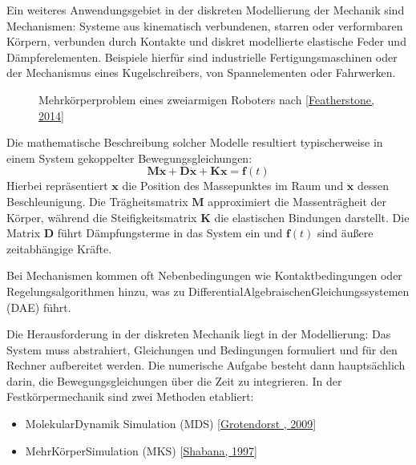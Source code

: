 \documentclass[letterpaper,10pt,german]{jupyterBook}
\let\sphinxpxdimen\pdfpxdimen\else\newdimen\sphinxpxdimen
\begin{document}
\sphinxAtStartPar
Ein weiteres Anwendungsgebiet in der diskreten Modellierung der Mechanik sind Mechanismen: Systeme aus kinematisch verbundenen, starren oder verformbaren Körpern, verbunden durch Kontakte und diskret modellierte elastische Feder\sphinxhyphen{} und Dämpferelementen. Beispiele hierfür sind industrielle Fertigungsmaschinen oder der Mechanismus eines Kugelschreibers, von Spannelementen oder Fahrwerken.

\begin{figure}[htbp]
\centering
\capstart

\noindent\sphinxincludegraphics[height=300\sphinxpxdimen]{{MKS_Robot}.png}
\caption{Mehrkörperproblem eines zweiarmigen Roboters nach {[}\hyperlink{cite.quellen:id11}{Featherstone, 2014}{]}}\label{\detokenize{chapters/chapter1/Einf_xfchrung_Modellklassifikation:mks}}\end{figure}

\sphinxAtStartPar
Die mathematische Beschreibung solcher Modelle resultiert typischerweise in einem System gekoppelter Bewegungsgleichungen:
\label{equation:chapters/chapter1/Einführung_Modellklassifikation:f0161430-5f5f-4a80-a5c1-711ca2f47725}\begin{equation}
\boldsymbol{M} \ddot{\boldsymbol{x}} + \boldsymbol{D} \dot{\boldsymbol{x}} + \boldsymbol{K} \boldsymbol{x} = \boldsymbol{f}(t)
\end{equation}
\sphinxAtStartPar
Hierbei repräsentiert \(\boldsymbol{x}\) die Position des Massepunktes im Raum und \(\ddot{\boldsymbol{x}}\) dessen Beschleunigung. Die Trägheitsmatrix \(\boldsymbol{M}\) approximiert die Massenträgheit der Körper, während die Steifigkeitsmatrix \(\boldsymbol{K}\) die elastischen Bindungen darstellt. Die Matrix \(\boldsymbol{D}\) führt Dämpfungsterme in das System ein und \(\boldsymbol{f}(t)\) sind äußere zeitabhängige Kräfte.

\sphinxAtStartPar
Bei Mechanismen kommen oft Nebenbedingungen wie Kontaktbedingungen oder Regelungsalgorithmen hinzu, was zu Differential\sphinxhyphen{}Algebraischen\sphinxhyphen{}Gleichungssystemen (DAE) führt.

\sphinxAtStartPar
Die Herausforderung in der diskreten Mechanik liegt in der Modellierung: Das System muss abstrahiert, Gleichungen und Bedingungen formuliert und für den Rechner aufbereitet werden. Die numerische Aufgabe besteht dann hauptsächlich darin, die Bewegungsgleichungen über die Zeit zu integrieren. In der Festkörpermechanik sind zwei Methoden etabliert:
\begin{itemize}
\item {} 
\sphinxAtStartPar
Molekular\sphinxhyphen{}Dynamik Simulation (MDS) {[}\hyperlink{cite.quellen:id5}{Grotendorst , 2009}{]}

\item {} 
\sphinxAtStartPar
Mehr\sphinxhyphen{}Körper\sphinxhyphen{}Simulation (MKS) {[}\hyperlink{cite.quellen:id6}{Shabana, 1997}{]}

\end{itemize}
\end{document}

